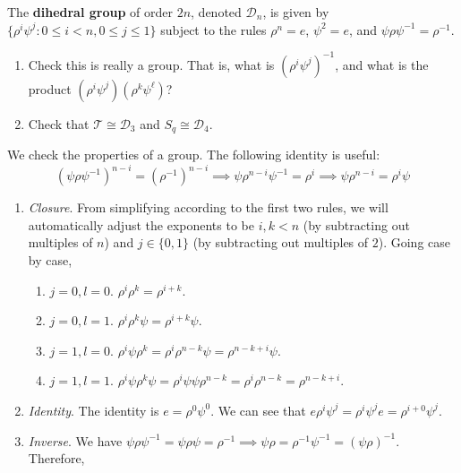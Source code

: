   \begin{exercise}[Shifrin 6.2.15.a/b]
    The \textbf{dihedral group} of order $2n$, denoted $\mathcal{D}_n$, is given by $\{\rho^i\psi^j : 0 \leq i < n, 0 \leq j \leq 1\}$ subject to the rules $\rho^n = e$, $\psi^2 = e$, and $\psi\rho\psi^{-1} = \rho^{-1}$.
    \begin{enumerate}
      \item Check this is really a group. That is, what is $(\rho^i\psi^j)^{-1}$, and what is the product $(\rho^i\psi^j)(\rho^k\psi^\ell)$?
      \item Check that $\mathcal{T} \cong \mathcal{D}_3$ and $S_q \cong \mathcal{D}_4$.
    \end{enumerate}
  \end{exercise}
  \begin{solution}
    We check the properties of a group. The following identity is useful: 
    \begin{equation}
      (\psi \rho \psi^{-1})^{n-i} = (\rho^{-1})^{n-i} \implies \psi \rho^{n-i} \psi^{-1} = \rho^i \implies \psi \rho^{n-i} = \rho^i \psi
    \end{equation}
    \begin{enumerate}
      \item \textit{Closure}. From simplifying according to the first two rules, we will automatically adjust the exponents to be $i, k < n$ (by subtracting out multiples of $n$) and $j \in \{0, 1\}$ (by subtracting out multiples of $2$). Going case by case, 
      \begin{enumerate}
        \item $j = 0, l = 0$. $\rho^i \rho^k = \rho^{i+k}$. 
        \item $j = 0, l = 1$. $\rho^i \rho^k \psi = \rho^{i+k} \psi$. 
        \item $j = 1, l = 0$. $\rho^i \psi \rho^k = \rho^i \rho^{n-k} \psi = \rho^{n-k+i} \psi$. 
        \item $j = 1, l = 1$. $\rho^i \psi \rho^k \psi = \rho^i \psi \psi \rho^{n-k} = \rho^i \rho^{n-k} = \rho^{n-k+i}$. 
      \end{enumerate}
      \item \textit{Identity}. The identity is $e = \rho^0 \psi^0$. We can see that $e \rho^i \psi^j = \rho^i \psi^j e = \rho^{i+0} \psi^j$. 
      \item \textit{Inverse}. We have $\psi \rho \psi^{-1} = \psi \rho \psi = \rho^{-1} \implies \psi \rho = \rho^{-1} \psi^{-1} = (\psi \rho)^{-1}$. Therefore, 
      \begin{equation}

\end{equation}
\end{enumerate}
\end{solution}
